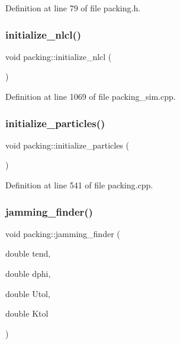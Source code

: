Definition at line 79 of file packing.\+h.

\mbox{\label{classpacking_af1514931993a8ea4fd14ff53f7d38b70}} 
\subsubsection{\texorpdfstring{initialize\+\_\+nlcl()}{initialize\_nlcl()}}
{\footnotesize\ttfamily void packing\+::initialize\+\_\+nlcl (\begin{DoxyParamCaption}{ }\end{DoxyParamCaption})}



Definition at line 1069 of file packing\+\_\+sim.\+cpp.

\mbox{\label{classpacking_a87d6f5a31dd8c3c0f30c40f6e8b478f2}} 
\subsubsection{\texorpdfstring{initialize\+\_\+particles()}{initialize\_particles()}}
{\footnotesize\ttfamily void packing\+::initialize\+\_\+particles (\begin{DoxyParamCaption}{ }\end{DoxyParamCaption})}



Definition at line 541 of file packing.\+cpp.

\mbox{\label{classpacking_aa78e20cbe7bb48eb52a319a7eaac0b92}} 
\subsubsection{\texorpdfstring{jamming\+\_\+finder()}{jamming\_finder()}}
{\footnotesize\ttfamily void packing\+::jamming\+\_\+finder (\begin{DoxyParamCaption}\item[{double}]{tend,  }\item[{double}]{dphi,  }\item[{double}]{Utol,  }\item[{double}]{Ktol }\end{DoxyParamCaption})}




